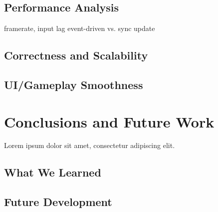 \documentclass[conference]{IEEEtran}
\begin{document}
\subsection{Performance Analysis}
framerate, input lag event-driven vs. sync update

\subsection{Correctness and Scalability}

\subsection{UI/Gameplay Smoothness}


\section{Conclusions and Future Work}

Lorem ipsum dolor sit amet, consectetur adipiscing elit.

\subsection{What We Learned}

\subsection{Future Development}
\end{document}
